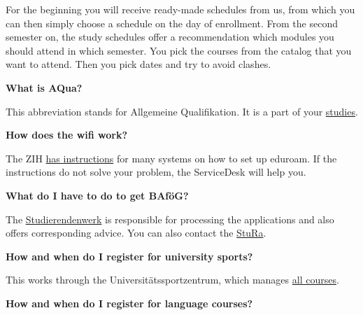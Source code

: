 For the beginning you will receive ready-made schedules from us, from which you can then simply choose a schedule on the day of enrollment. From the second semester on, the study schedules offer a recommendation which modules you should attend in which semester. You pick the courses from the catalog that you want to attend. Then you pick dates and try to avoid clashes.

\textbf{What is AQua?}

This abbreviation stands for Allgemeine Qualifikation.
It is a part of your \hyperlink{lec:aqua}{studies}.


\textbf{How does the wifi work?}

The ZIH \href{https://tu-dresden.de/zih/dienste/service-katalog/arbeitsumgebung/zugang_datennetz/wlan-eduroam}{has instructions} for many systems on how to set up eduroam.
If the instructions do not solve your problem, the ServiceDesk will help you.

\textbf{What do I have to do to get BAföG?}

The \hyperlink{sec:stuwe}{Studierendenwerk} is responsible for processing the applications and also offers corresponding advice.
You can also contact the \hyperlink{sec:stura}{StuRa}.

\textbf{How and when do I register for university sports?}

This works through the Universitätssportzentrum, which manages \hyperlink{sec:sport}{all courses}.

\textbf{How and when do I register for language courses?}

